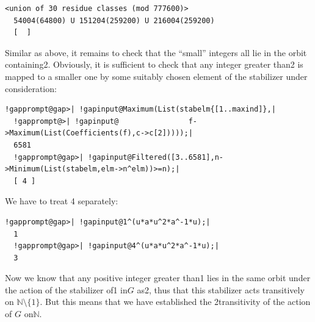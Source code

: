 \documentclass[a4paper,11pt]{report}
\begin{document}
{{\begin{Verbatim}[commandchars=!@|,fontsize=\small,frame=single,label=Example]
  <union of 30 residue classes (mod 777600)>
  54004(64800) U 151204(259200) U 216004(259200)
  [  ]
\end{Verbatim}
 Similar as above, it remains to check that the ``small'' integers all lie in the orbit containing{\nobreakspace}2. Obviously, it is
sufficient to check that any integer greater than{\nobreakspace}2 is mapped to
a smaller one by some suitably chosen element of the stabilizer under
consideration: 
\begin{Verbatim}[commandchars=!@|,fontsize=\small,frame=single,label=Example]
  !gapprompt@gap>| !gapinput@Maximum(List(stabelm{[1..maxind]},|
  !gapprompt@>| !gapinput@                f->Maximum(List(Coefficients(f),c->c[2]))));|
  6581
  !gapprompt@gap>| !gapinput@Filtered([3..6581],n->Minimum(List(stabelm,elm->n^elm))>=n);|
  [ 4 ]
\end{Verbatim}
 We have to treat 4 separately: 
\begin{Verbatim}[commandchars=!@|,fontsize=\small,frame=single,label=Example]
  !gapprompt@gap>| !gapinput@1^(u*a*u^2*a^-1*u);|
  1
  !gapprompt@gap>| !gapinput@4^(u*a*u^2*a^-1*u);|
  3
\end{Verbatim}
 Now we know that any positive integer greater than{\nobreakspace}1 lies in the
same orbit under the action of the stabilizer of{\nobreakspace}1
in{\nobreakspace}$G$ as{\nobreakspace}2, thus that this stabilizer acts transitively on ${\ensuremath{\mathbb N}} \setminus \{1\}$. But this means that we have established the
2\texttt{}transitivity of the action of $G$ on{\nobreakspace}{\ensuremath{\mathbb N}}. 

}}
\end{document}
